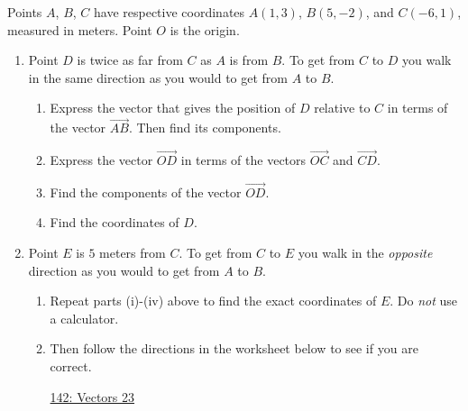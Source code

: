 \documentclass{ximera}
\begin{document}
\begin{question} \label{Q944tfghhnvbfc}
Points $A$, $B$, $C$ have respective coordinates $A(1,3)$, $B(5,-2)$, and $C(-6,1)$, measured in meters. Point $O$ is the origin.
\begin{enumerate}
\item Point $D$ is twice as far from $C$ as $A$ is from $B$. To get from $C$ to $D$ you walk in the same direction as you would to get from $A$ to $B$.

\begin{enumerate}

\item Express the vector that gives the position of $D$ relative to $C$ in terms of the vector $\overrightarrow{AB}$. Then find its components.

\item Express the vector $\overrightarrow{OD}$ in terms of the vectors $\overrightarrow{OC}$ and $\overrightarrow{CD}$.

\item Find the components of the vector $\overrightarrow{OD}$.

\item Find the coordinates of $D$.
\end{enumerate}

\item Point $E$ is $5$ meters from $C$. To get from $C$ to $E$ you walk in the \emph{opposite} direction as you would to get from $A$ to $B$. 

\begin{enumerate}
\item Repeat parts (i)-(iv) above to find the exact coordinates of $E$. Do \emph{not} use a calculator.

\item Then follow the directions in the worksheet below to see if you are correct.

\begin{onlineOnly}
    \begin{center}
\end{center}
\end{onlineOnly}

\href{https://www.desmos.com/calculator/bk4xda8g08}{142: Vectors 23}

\end{enumerate}
\end{enumerate}

\end{question}
\end{document}
